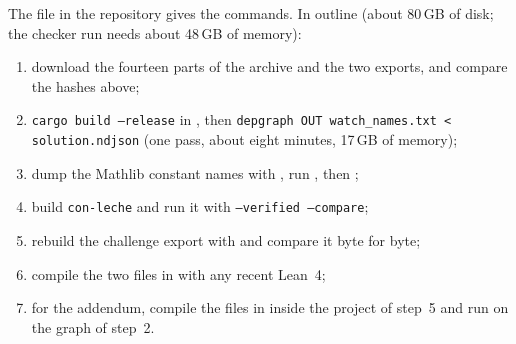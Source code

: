 The file  in the repository gives the commands. In outline (about 80\,GB of disk; the checker run needs about 48\,GB of memory):
\begin{enumerate}
\item download the fourteen parts of the archive and the two exports, and compare the hashes above;
\item \texttt{cargo build --release} in , then \texttt{depgraph OUT watch\_names.txt < solution.ndjson} (one pass, about eight minutes, 17\,GB of memory);
\item dump the Mathlib constant names with , run , then ;
\item build \texttt{con-leche} and run it with \texttt{--verified --compare};
\item rebuild the challenge export with  and compare it byte for byte;
\item compile the two files in  with any recent Lean~4;
\item for the addendum, compile the files in  inside the project of step~5 and run  on the graph of step~2.
\end{enumerate}
